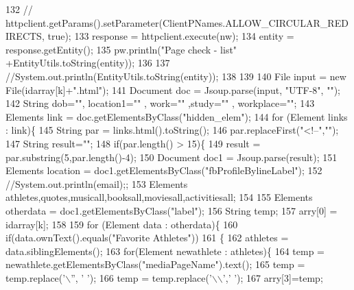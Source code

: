 \begin{DoxyCode}
132     \textcolor{comment}{//  httpclient.getParams().setParameter(ClientPNames.ALLOW\_CIRCULAR\_REDIRECTS, true);}
133         response = httpclient.execute(nw);
134         entity = response.getEntity();
135         pw.println(\textcolor{stringliteral}{"Page check - list"} +EntityUtils.toString(entity));
136         
137         \textcolor{comment}{//System.out.println(EntityUtils.toString(entity));}
138         
139         
140         File input = \textcolor{keyword}{new} File(idarray[k]+\textcolor{stringliteral}{".html"});
141         Document doc = Jsoup.parse(input, \textcolor{stringliteral}{"UTF-8"}, \textcolor{stringliteral}{""});
142         String dob=\textcolor{stringliteral}{""}, location1=\textcolor{stringliteral}{""} , work=\textcolor{stringliteral}{""} ,study=\textcolor{stringliteral}{""} , workplace=\textcolor{stringliteral}{""};
143         Elements link = doc.getElementsByClass(\textcolor{stringliteral}{"hidden\_elem"});
144         \textcolor{keywordflow}{for} (Element links : link)\{
145             String par = links.html().toString();
146             par.replaceFirst(\textcolor{stringliteral}{"<!--"},\textcolor{stringliteral}{""});
147             String result=\textcolor{stringliteral}{""};
148             \textcolor{keywordflow}{if}(par.length() > 15)\{
149             result = par.substring(5,par.length()-4);
150             Document doc1 = Jsoup.parse(result);
151             Elements location = doc1.getElementsByClass(\textcolor{stringliteral}{"fbProfileBylineLabel"});
152             \textcolor{comment}{//System.out.println(email);;}
153             Elements athletes,quotes,musicall,booksall,moviesall,activitiesall;
154             
155             Elements otherdata = doc1.getElementsByClass(\textcolor{stringliteral}{"label"});
156             String temp;
157             arry[0] = idarray[k];
158             
159             \textcolor{keywordflow}{for} (Element data : otherdata)\{
160                 \textcolor{keywordflow}{if}(data.ownText().equals(\textcolor{stringliteral}{"Favorite Athletes"}))
161                 \{
162                     athletes = data.siblingElements();
163                 \textcolor{keywordflow}{for}(Element newathlete : athletes)\{
164                     temp = newathlete.getElementsByClass(\textcolor{stringliteral}{"mediaPageName"}).text();
165                     temp = temp.replace(\textcolor{charliteral}{'\(\backslash\)''}, \textcolor{charliteral}{' '});
166                     temp = temp.replace(\textcolor{charliteral}{'\(\backslash\)\(\backslash\)'},\textcolor{charliteral}{' '});
167                     arry[3]=temp;

\end{DoxyCode}

